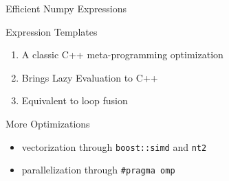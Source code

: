 \documentclass[aspectratio=1610]{beamer}
\begin{document}
\begin{frame}{Efficient Numpy Expressions}
    \begin{block}{Expression Templates}
        \begin{enumerate}
            \item A classic C++ meta-programming optimization
            \item Brings Lazy Evaluation to C++
            \item Equivalent to loop fusion
        \end{enumerate}
    \end{block}

    \begin{block}{More Optimizations}
        \begin{itemize}
            \item vectorization through \texttt{boost::simd} and \texttt{nt2}
            \item parallelization through \texttt{\#pragma omp}
        \end{itemize}
    \end{block}
\end{frame}


% 
% 
\end{document}
